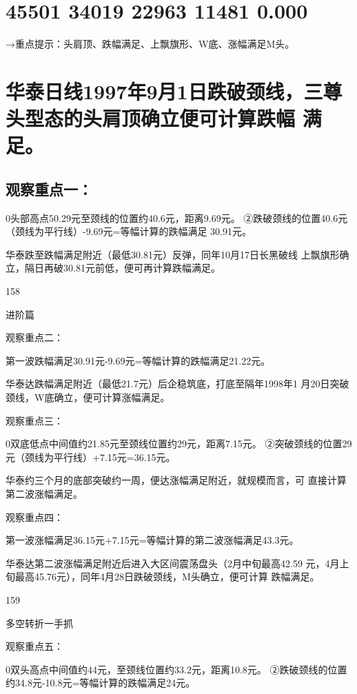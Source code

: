 \documentclass{article}
\begin{document}
\section{45501 34019 22963 11481 0.000}

→重点提示：头肩顶、跌幅满足、上飘旗形、W底、涨幅满足M头。

\section{华泰日线1997年9月1日跌破颈线，三尊头型态的头肩顶确立便可计算跌幅 满足。}

\subsection{观察重点一：}

0头部高点50.29元至颈线的位置约40.6元，距离9.69元。 ②跌破颈线的位置40.6元（颈线为平行线）-9.69元=等幅计算的跌幅满足 30.91元。

华泰跌至跌幅满足附近（最低30.81元）反弹，同年10月17日长黑破线 上飘旗形确立，隔日再破30.81元前低，便可再计算跌幅满足。

158

\clearpage

进阶篇

观察重点二：

第一波跌幅满足30.91元-9.69元=等幅计算的跌幅满足21.22元。

华泰达跌幅满足附近（最低21.7元）后企稳筑底，打底至隔年1998年1 月20日突破颈线，W底确立，便可计算涨幅满足。

观察重点三：

0双底低点中间值约21.85元至颈线位置约29元，距离7.15元。 ②突破颈线的位置29元（颈线为平行线）+7.15元=36.15元。

华泰约三个月的底部突破约一周，便达涨幅满足附近，就规模而言，可 直接计算第二波涨幅满足。

观察重点四：

第一波涨幅满足36.15元+7.15元=等幅计算的第二波涨幅满足43.3元。

华泰达第二波涨幅满足附近后进入大区间震荡盘头（2月中旬最高42.59 元，4月上旬最高45.76元），同年4月28日跌破颈线，M头确立，便可计算 跌幅满足。

159

\clearpage

多空转折一手抓

观察重点五：

0双头高点中间值约44元，至颈线位置约33.2元，距离10.8元。 ②跌破颈线的位置约34.8元-10.8元=等幅计算的跌幅满足24元。
\end{document}
